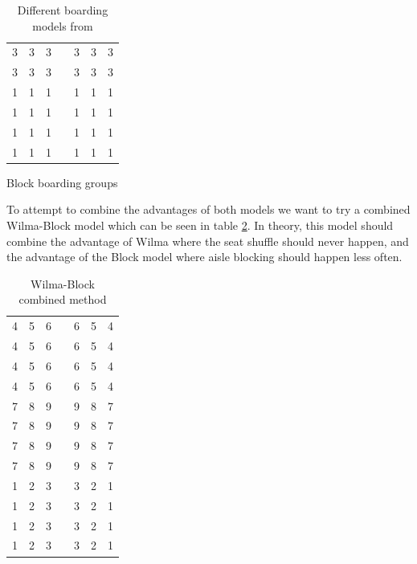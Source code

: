 \documentclass[english]{article}
\begin{document}
\begin{table}[H]
\begin{subtable}[h]{0.45\textwidth}
\begin{tabular}{|c c c|c|c c c|}
        3 & 3 & 3 & \cellcolor{lightgray} & 3 & 3 & 3 \\
        3 & 3 & 3 & \cellcolor{lightgray} & 3 & 3 & 3 \\
        \hline
        1 & 1 & 1 & \cellcolor{lightgray} & 1 & 1 & 1 \\
        1 & 1 & 1 & \cellcolor{lightgray} & 1 & 1 & 1 \\
        1 & 1 & 1 & \cellcolor{lightgray} & 1 & 1 & 1 \\
        1 & 1 & 1 & \cellcolor{lightgray} & 1 & 1 & 1 \\
    \hline
    \end{tabular}
        \caption{Block boarding groups}
        \label{tab:block_group}
     \end{subtable}
     \caption{Different boarding models from\cite{STEFFEN201264} }
     \label{tab:paper_methods}
\end{table}

To attempt to combine the advantages of both models we want to try a combined Wilma-Block model which can be seen in table \ref{tab:wilmablock_group}. In theory, this model should combine the advantage of Wilma where the seat shuffle should never happen, and the advantage of the Block model where aisle blocking should happen less often.  

\begin{table}[H]
    \centering
        \begin{tabular}{|c|c|c|c|c|c|c|}
    \hline
    \rowcolor{lightgray}\multicolumn{7}{|c|}{front}\\
    \hline
        4 & 5 & 6 & \cellcolor{lightgray} & 6 & 5 & 4 \\
        4 & 5 & 6 & \cellcolor{lightgray} & 6 & 5 & 4 \\
        4 & 5 & 6 & \cellcolor{lightgray} & 6 & 5 & 4 \\
        4 & 5 & 6 & \cellcolor{lightgray} & 6 & 5 & 4 \\
        \hline
        7 & 8 & 9 & \cellcolor{lightgray} & 9 & 8 & 7 \\
        7 & 8 & 9 & \cellcolor{lightgray} & 9 & 8 & 7 \\
        7 & 8 & 9 & \cellcolor{lightgray} & 9 & 8 & 7 \\
        7 & 8 & 9 & \cellcolor{lightgray} & 9 & 8 & 7 \\
        \hline
        1 & 2 & 3 & \cellcolor{lightgray} & 3 & 2 & 1 \\
        1 & 2 & 3 & \cellcolor{lightgray} & 3 & 2 & 1 \\
        1 & 2 & 3 & \cellcolor{lightgray} & 3 & 2 & 1 \\
        1 & 2 & 3 & \cellcolor{lightgray} & 3 & 2 & 1 \\
    \hline
    \end{tabular}
    \caption{Wilma-Block combined method}
    \label{tab:wilmablock_group}
\end{table}
\end{document}
